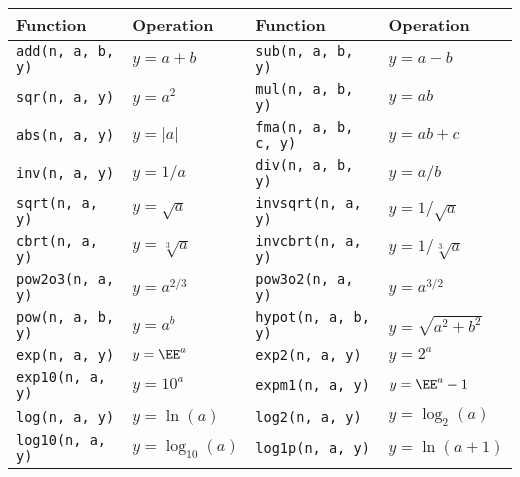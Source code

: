 \begin{table}[ht]
  \begin{tabu}{X[l]X[l]X[l]X[l]}
    \toprule
    Function & Operation & Function & Operation \\
    \midrule
    \texttt{add(n, a, b, y)}    & $y = a + b$                               &
    \texttt{sub(n, a, b, y)}    & $y = a - b$                               \\
    \texttt{sqr(n, a, y)}       & $y = a^2$                                 &
    \texttt{mul(n, a, b, y)}    & $y = ab$                                  \\
    \texttt{abs(n, a, y)}       & $y = |a|$                                 &
    \texttt{fma(n, a, b, c, y)} & $y = ab + c$                              \\
    \texttt{inv(n, a, y)}       & $y = 1 / a$                               &
    \texttt{div(n, a, b, y)}    & $y = a / b$                               \\
    \texttt{sqrt(n, a, y)}      & $y = \sqrt{a}$                            &
    \texttt{invsqrt(n, a, y)}   & $y = 1 / \sqrt{a}$                        \\
    \texttt{cbrt(n, a, y)}      & $y = \sqrt[3]{a}$                         &
    \texttt{invcbrt(n, a, y)}   & $y = 1 / \sqrt[3]{a}$                     \\
    \texttt{pow2o3(n, a, y)}    & $y = a^{2/3}$                             &
    \texttt{pow3o2(n, a, y)}    & $y = a^{3/2}$                             \\
    \texttt{pow(n, a, b, y)}    & $y = a^b$                                 &
    \texttt{hypot(n, a, b, y)}  & $y = \sqrt{a^2 + b^2}$                    \\
    \texttt{exp(n, a, y)}       & $y = \EE^a$                               &
    \texttt{exp2(n, a, y)}      & $y = 2^a$                                 \\
    \texttt{exp10(n, a, y)}     & $y = 10^a$                                &
    \texttt{expm1(n, a, y)}     & $y = \EE^a - 1$                           \\
    \texttt{log(n, a, y)}       & $y = \ln(a)$                              &
    \texttt{log2(n, a, y)}      & $y = \log_2(a)$                           \\
    \texttt{log10(n, a, y)}     & $y = \log_{10}(a)$                        &
    \texttt{log1p(n, a, y)}     & $y = \ln(a + 1)$                          \\

\end{tabu}
\end{table}
